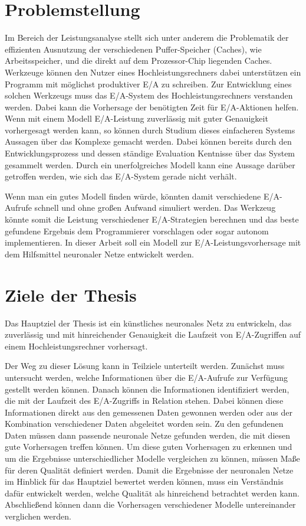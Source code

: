 \documentclass[
	12pt,
	a4paper,
	BCOR10mm,
	DIV14,
	listof=totoc,
	bibliography=totoc,
	headsepline
]{scrreprt}
\begin{document}
\section{Problemstellung}
Im Bereich der Leistungsanalyse stellt sich unter anderem die Problematik der effizienten Ausnutzung der verschiedenen Puffer-Speicher (Caches), wie Arbeitsspeicher, und die direkt auf dem Prozessor-Chip liegenden Caches.
Werkzeuge können den Nutzer eines Hochleistungsrechners dabei unterstützen ein Programm mit möglichst produktiver E/A zu schreiben. 
Zur Entwicklung eines solchen Werkzeugs muss das E/A-System des Hochleistungsrechners verstanden werden.
Dabei kann die Vorhersage der benötigten Zeit für E/A-Aktionen helfen. Wenn mit einem Modell E/A-Leistung zuverlässig mit guter Genauigkeit vorhergesagt werden kann, so können durch Studium dieses einfacheren Systems Aussagen über das Komplexe gemacht werden.
Dabei können bereits durch den Entwicklungsprozess und dessen ständige Evaluation Kentnisse über das System gesammelt werden. Durch ein unerfolgreiches Modell kann eine Aussage darüber getroffen werden, wie sich das E/A-System gerade nicht verhält.
  
Wenn man ein gutes Modell finden würde, könnten damit verschiedene E/A-Aufrufe schnell und ohne großen Aufwand simuliert werden. Das Werkzeug könnte somit die Leistung verschiedener E/A-Strategien berechnen und das beste gefundene Ergebnis dem Programmierer vorschlagen oder sogar autonom implementieren.  
In dieser Arbeit soll ein Modell zur E/A-Leistungsvorhersage mit dem Hilfsmittel neuronaler Netze entwickelt werden. 

\section{Ziele der Thesis}
Das Hauptziel der Thesis ist ein künstliches neuronales Netz zu entwickeln, das zuverlässig und mit hinreichender Genauigkeit die Laufzeit von E/A-Zugriffen auf einem Hochleistungsrechner vorhersagt. 

Der Weg zu dieser Lösung kann in Teilziele unterteilt werden.
Zunächst muss untersucht werden, welche Informationen über die E/A-Aufrufe zur Verfügung gestellt werden können.
Danach können die Informationen identifiziert werden, die mit der Laufzeit des E/A-Zugriffs in Relation stehen. Dabei können diese Informationen direkt aus den gemessenen Daten gewonnen werden oder aus der Kombination verschiedener Daten abgeleitet worden sein.
Zu den gefundenen Daten müssen dann passende neuronale Netze gefunden werden, die mit diesen gute Vorhersagen treffen können.
Um diese guten Vorhersagen zu erkennen und um die Ergebnisse unterschiedlicher Modelle vergleichen zu können, müssen Maße für deren Qualität definiert werden.
Damit die Ergebnisse der neuronalen Netze im Hinblick für das Hauptziel bewertet werden können, muss ein Verständnis dafür entwickelt werden, welche Qualität als hinreichend betrachtet werden kann.
Abschließend können dann die Vorhersagen verschiedener Modelle untereinander verglichen werden.
\end{document}
